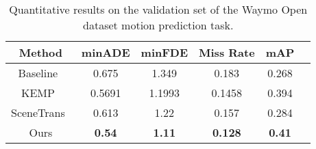 \documentclass[10pt,twocolumn,letterpaper]{article}
\begin{document}
\begin{table}
\begin{center}
      \small
      \centering
      \setlength{\tabcolsep}{4pt}
\begin{tabular}{cccccc}
      \hline 
      Method & minADE & minFDE & Miss Rate & mAP\\
      \hline\hline
      Baseline~\cite{ettinger2021large} & 0.675 &  1.349 & 0.183 & 0.268 \\
      \hline
      KEMP~\cite{lu2022kemp} & 0.5691 & 1.1993& 0.1458& 0.394 \\
      \hline
     SceneTrans~\cite{ngiam2021scene}
 & 0.613 & 
1.22 &
0.157 & 
0.284 \\
      
      \hline
      Ours & \textbf{0.54} & \textbf{1.11} & \textbf{0.128} & \textbf{0.41} \\
      \hline
      
      \end{tabular}
   \end{center}



\caption{Quantitative results on the validation set of the Waymo Open dataset motion prediction task.}
\label{tab:waymo_results}
\end{table}
\end{document}

